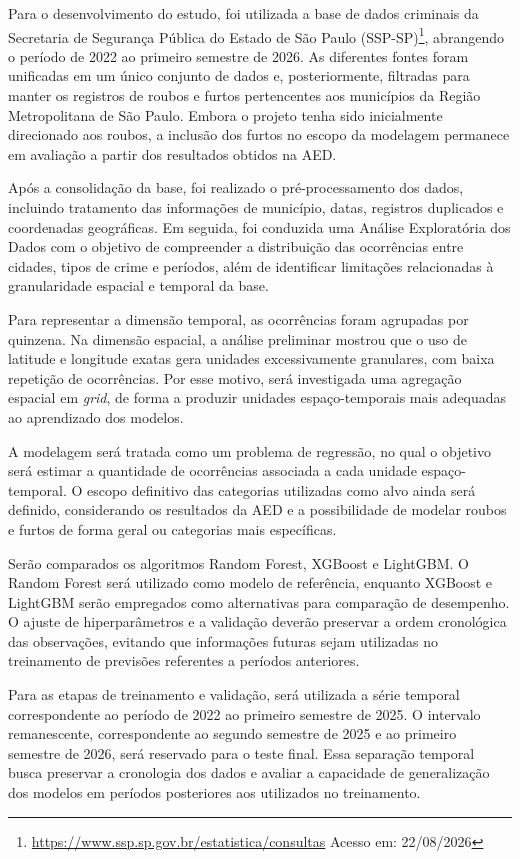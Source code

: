 \documentclass[12pt]{article}
\begin{document}
Para o desenvolvimento do estudo, foi utilizada a base de dados criminais da Secretaria de Segurança Pública do Estado de São Paulo (SSP-SP)\footnote{\url{https://www.ssp.sp.gov.br/estatistica/consultas} Acesso em: 22/08/2026}, abrangendo o período de 2022 ao primeiro semestre de 2026. As diferentes fontes foram unificadas em um único conjunto de dados e, posteriormente, filtradas para manter os registros de roubos e furtos pertencentes aos municípios da Região Metropolitana de São Paulo. Embora o projeto tenha sido inicialmente direcionado aos roubos, a inclusão dos furtos no escopo da modelagem permanece em avaliação a partir dos resultados obtidos na AED.

Após a consolidação da base, foi realizado o pré-processamento dos dados, incluindo tratamento das informações de município, datas, registros duplicados e coordenadas geográficas. Em seguida, foi conduzida uma Análise Exploratória dos Dados com o objetivo de compreender a distribuição das ocorrências entre cidades, tipos de crime e períodos, além de identificar limitações relacionadas à granularidade espacial e temporal da base.

Para representar a dimensão temporal, as ocorrências foram agrupadas por quinzena. Na dimensão espacial, a análise preliminar mostrou que o uso de latitude e longitude exatas gera unidades excessivamente granulares, com baixa repetição de ocorrências. Por esse motivo, será investigada uma agregação espacial em \textit{grid}, de forma a produzir unidades espaço-temporais mais adequadas ao aprendizado dos modelos.

A modelagem será tratada como um problema de regressão, no qual o objetivo será estimar a quantidade de ocorrências associada a cada unidade espaço-temporal. O escopo definitivo das categorias utilizadas como alvo ainda será definido, considerando os resultados da AED e a possibilidade de modelar roubos e furtos de forma geral ou categorias mais específicas.

Serão comparados os algoritmos Random Forest, XGBoost e LightGBM. O Random Forest será utilizado como modelo de referência, enquanto XGBoost e LightGBM serão empregados como alternativas para comparação de desempenho. O ajuste de hiperparâmetros e a validação deverão preservar a ordem cronológica das observações, evitando que informações futuras sejam utilizadas no treinamento de previsões referentes a períodos anteriores.

Para as etapas de treinamento e validação, será utilizada a série temporal correspondente ao período de 2022 ao primeiro semestre de 2025. O intervalo remanescente, correspondente ao segundo semestre de 2025 e ao primeiro semestre de 2026, será reservado para o teste final. Essa separação temporal busca preservar a cronologia dos dados e avaliar a capacidade de generalização dos modelos em períodos posteriores aos utilizados no treinamento.
\end{document}

